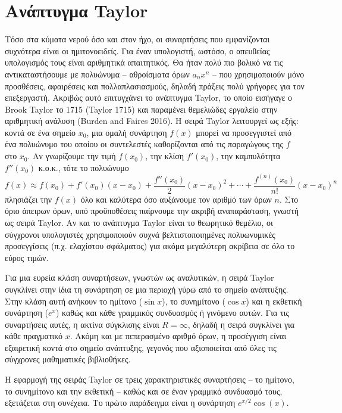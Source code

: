 \documentclass[a4paper, 11pt]{article}
\begin{document}
\section{Ανάπτυγμα
Taylor}\label{ux3b1ux3bdux3acux3c0ux3c4ux3c5ux3b3ux3bcux3b1-taylor}

Τόσο στα κύματα νερού όσο και στον ήχο, οι συναρτήσεις που εμφανίζονται
συχνότερα είναι οι ημιτονοειδείς. Για έναν υπολογιστή, ωστόσο, ο
απευθείας υπολογισμός τους είναι αριθμητικά απαιτητικός. Θα ήταν πολύ
πιο βολικό να τις αντικαταστήσουμε με πολυώνυμα -- αθροίσματα όρων
\(a_n x^n\) -- που χρησιμοποιούν μόνο προσθέσεις, αφαιρέσεις και
πολλαπλασιασμούς, δηλαδή πράξεις πολύ γρήγορες για τον επεξεργαστή.
Ακριβώς αυτό επιτυγχάνει το ανάπτυγμα Taylor, το οποίο εισήγαγε ο Brook
Taylor το 1715 (Taylor 1715) και παραμένει θεμελιώδες εργαλείο στην
αριθμητική ανάλυση (Burden and Faires 2016). Η σειρά Taylor λειτουργεί
ως εξής: κοντά σε ένα σημείο \(x_0\), μια ομαλή συνάρτηση \(f(x)\)
μπορεί να προσεγγιστεί από ένα πολυώνυμο του οποίου οι συντελεστές
καθορίζονται από τις παραγώγους της \(f\) στο \(x_0\). Αν γνωρίζουμε την
τιμή \(f(x_0)\), την κλίση \(f'(x_0)\), την καμπυλότητα \(f''(x_0)\)
κ.ο.κ., τότε το πολυώνυμο
\[ f(x) \approx f(x_0) + f'(x_0)(x-x_0) + \frac{f''(x_0)}{2}(x-x_0)^2 + \cdots + \frac{f^{(n)}(x_0)}{n!}(x-x_0)^n \]
πλησιάζει την \(f(x)\) όλο και καλύτερα όσο αυξάνουμε τον αριθμό των
όρων \(n\). Στο όριο άπειρων όρων, υπό προϋποθέσεις παίρνουμε την ακριβή
αναπαράσταση, γνωστή ως σειρά Taylor. Αν και το ανάπτυγμα Taylor είναι
το θεωρητικό θεμέλιο, οι σύγχρονοι υπολογιστές χρησιμοποιούν συχνά
βελτιστοποιημένες πολυωνυμικές προσεγγίσεις (π.χ. ελαχίστου σφάλματος)
για ακόμα μεγαλύτερη ακρίβεια σε όλο το εύρος τιμών.

Για μια ευρεία κλάση συναρτήσεων, γνωστών ως αναλυτικών, η σειρά Taylor
συγκλίνει στην ίδια τη συνάρτηση σε μια περιοχή γύρω από το σημείο
ανάπτυξης. Στην κλάση αυτή ανήκουν το ημίτονο (\(\sin x\)), το
συνημίτονο (\(\cos x\)) και η εκθετική συνάρτηση (\(e^x\)) καθώς και
κάθε γραμμικός συνδυασμός ή γινόμενο αυτών. Για τις συναρτήσεις αυτές, η
ακτίνα σύγκλισης είναι \(R = \infty\), δηλαδή η σειρά συγκλίνει για κάθε
πραγματικό \(x\). Ακόμη και με πεπερασμένο αριθμό όρων, η προσέγγιση
είναι εξαιρετική κοντά στο σημείο ανάπτυξης, γεγονός που αξιοποιείται
από όλες τις σύγχρονες μαθηματικές βιβλιοθήκες.

Η εφαρμογή της σειράς Taylor σε τρεις χαρακτηριστικές συναρτήσεις -- το
ημίτονο, το συνημίτονο και την εκθετική -- καθώς και σε έναν γραμμικό
συνδυασμό τους, εξετάζεται στη συνέχεια. Το πρώτο παράδειγμα είναι η
συνάρτηση \(e^{x/2}\cos(x)\).
\end{document}
